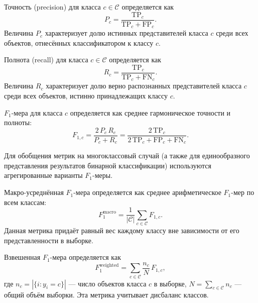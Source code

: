 \begin{definition}[Precision]
\label{def:precision}
Точность (precision) для класса $c \in \mathcal{C}$ определяется как
\begin{equation}
    P_c = \frac{\mathrm{TP}_c}{\mathrm{TP}_c + \mathrm{FP}_c}.
    \label{eq:precision}
\end{equation}
Величина $P_c$ характеризует долю истинных представителей класса $c$
среди всех объектов, отнесённых классификатором к классу $c$.
\end{definition}

\begin{definition}[Recall]
\label{def:recall}
Полнота (recall) для класса $c \in \mathcal{C}$ определяется как
\begin{equation}
    R_c = \frac{\mathrm{TP}_c}{\mathrm{TP}_c + \mathrm{FN}_c}.
    \label{eq:recall}
\end{equation}
Величина $R_c$ характеризует долю верно распознанных представителей
класса $c$ среди всех объектов, истинно принадлежащих классу $c$.
\end{definition}

\begin{definition}[$F_1$-мера]
\label{def:f1}
$F_1$-мера для класса $c$ определяется как среднее гармоническое точности
и полноты:
\begin{equation}
    F_{1,c} = \frac{2\,P_c\,R_c}{P_c + R_c}
            = \frac{2\,\mathrm{TP}_c}{2\,\mathrm{TP}_c + \mathrm{FP}_c + \mathrm{FN}_c}.
    \label{eq:f1}
\end{equation}
\end{definition}

Для обобщения метрик на многоклассовый случай (а также для единообразного
представления результатов бинарной классификации) используются агрегированные
варианты $F_1$-меры.

\begin{definition}[Macro $F_1$]
\label{def:macro-f1}
Макро-усреднённая $F_1$-мера определяется как среднее арифметическое
$F_1$-мер по всем классам:
\begin{equation}
    F_1^{\mathrm{macro}} = \frac{1}{|\mathcal{C}|}
        \sum_{c \in \mathcal{C}} F_{1,c}.
    \label{eq:macro-f1}
\end{equation}
Данная метрика придаёт равный вес каждому классу вне зависимости от его
представленности в выборке.
\end{definition}

\begin{definition}[Weighted $F_1$]
\label{def:weighted-f1}
Взвешенная $F_1$-мера определяется как
\begin{equation}
    F_1^{\mathrm{weighted}} = \sum_{c \in \mathcal{C}}
        \frac{n_c}{N}\,F_{1,c},
    \label{eq:weighted-f1}
\end{equation}
где $n_c = |\{i : y_i = c\}|$ --- число объектов класса $c$ в выборке,
$N = \sum_{c \in \mathcal{C}} n_c$ --- общий объём выборки.
Эта метрика учитывает дисбаланс классов.
\end{definition}

